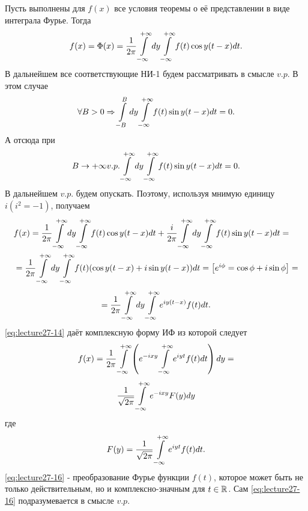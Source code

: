 
\begin{col-answer-preambule}
\end{col-answer-preambule}

Пусть выполнены для $f(x)$ все условия теоремы о её представлении в виде интеграла Фурье. Тогда
\begin{align*}
  f(x) = \Phi(x) = \dfrac{1}{2\pi}\int\limits_{-\infty}^{+\infty}dy\int\limits_{-\infty}^{+\infty}f(t)\cos y(t - x)dt.
\end{align*}
В дальнейшем все соответствующие НИ-1 будем рассматривать в смысле $v.p.$ В этом случае
\begin{align*}
  \forall B > 0 \Rightarrow \int\limits_{-B}^Bdy\int\limits_{-\infty}^{+\infty}f(t)\sin y(t - x)dt = 0.
\end{align*}
А отсюда при
\begin{align*}
  B \to +\infty v.p.\int\limits_{-\infty}^{+\infty}dy\int\limits_{-\infty}^{+\infty}f(t)\sin y(t - x)dt = 0.
\end{align*}
В дальнейшем $v.p.$ будем опускать. Поэтому, используя мнимую единицу $i (i^2 = -1)$, получаем
\begin{align*}
  &f(x) = \dfrac{1}{2\pi}\int\limits_{-\infty}^{+\infty}dy\int\limits_{-\infty}^{+\infty}f(t)\cos y(t - x)dt +
  \dfrac{i}{2\pi}\int\limits_{-\infty}^{+\infty}dy\int\limits_{-\infty}^{+\infty}f(t)\sin y(t - x)dt =\\
  &=\dfrac{1}{2\pi}\int\limits_{-\infty}^{+\infty}dy\int\limits_{-\infty}^{+\infty}f(t)(\cos y(t - x) + i\sin y(t - x))dt
  = \left[\begin{matrix}e^{i\phi} = \cos\phi + i\sin\phi\end{matrix}\right] =
\end{align*}
\begin{equation}
  \label{eq:lecture27-14}
  = \dfrac{1}{2\pi}\int\limits_{-\infty}^{+\infty}dy\int\limits_{-\infty}^{+\infty}e^{iy(t - x)}f(t)dt.
\end{equation}
\eqref{eq:lecture27-14} даёт комплексную форму ИФ из которой следует
\begin{align*}
  f(x) = \dfrac{1}{2\pi}\int\limits_{-\infty}^{+\infty}\left( e^{-ixy}\int\limits_{-\infty}^{+\infty}e^{iyt}f(t)dt \right)
  dy =
\end{align*}
\begin{equation}
  \label{eq:lecture27-15}
  \dfrac{1}{\sqrt{2\pi}}\int\limits_{-\infty}^{+\infty}e^{-ixy}F(y)dy
\end{equation}
где
\begin{equation}
  \label{eq:lecture27-16}
  F(y) = \dfrac{1}{\sqrt{2\pi}}\int\limits_{-\infty}^{+\infty}e^{iyt}f(t)dt.
\end{equation}
\eqref{eq:lecture27-16} - преобразование Фурье функции $f(t)$, которое может быть не только
действительным, но и комплексно-значным для $t \in \mathbb{R}^{}$. Сам \eqref{eq:lecture27-16} подразумевается
в смысле $v.p.$

